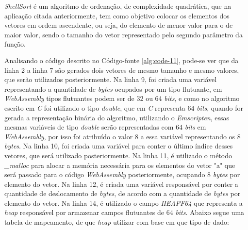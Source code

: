 \textit{ShellSort} é um algoritmo de ordenação, de complexidade quadrática, que na
aplicação citada anteriormente, tem como objetivo colocar os elementos dos vetores em
ordem ascendente, ou seja, do elemento de menor valor para o de maior valor, sendo o
tamanho do vetor representado pelo segundo parâmetro da função.

Analisando o código descrito no Código-fonte \ref{alg:code-11}, pode-se ver que da linha 2
a linha 7 são gerados dois vetores de mesmo tamanho e mesmo valores, que serão utilizados
posteriormente. Na linha 9, foi criada uma variável representando a quantidade de
\textit{bytes} ocupados por um tipo flutuante, em \textit{WebAssembly} tipos flutuantes
podem ser de 32 ou 64 \textit{bits}, e como no algoritmo escrito em \textit{C} foi
utilizado o tipo \textit{double}, que em \textit{C} representa 64 \textit{bits}, quando
for gerada a representação binária do algoritmo, utilizando o \textit{Emscripten}, essas
mesmas variáveis de tipo \textit{double} serão representadas com 64 \textit{bits} em
\textit{WebAssembly}, por isso foi atribuído o valor 8 a essa variável representando os 8
\textit{bytes}. Na linha 10, foi criada uma variável para conter o último índice desses
vetores, que será utilizado posteriormente. Na linha 11, é utilizado o método
\textit{\_malloc} para alocar a memória necessária para os elementos do vetor "a" que será
passado para o código \textit{WebAssembly} posteriormente, ocupando 8 \textit{bytes}
por elemento do vetor. Na linha 12, é criada uma variável responsável por conter a
quantidade de deslocamento de \textit{bytes}, de acordo com a quantidade de \textit{bytes}
por elemento do vetor. Na linha 14, é utilizado o campo \textit{HEAPF64} que representa a
\textit{heap} responsável por armazenar campos flutuantes de 64 \textit{bits}. Abaixo
segue uma tabela de mapeamento, de que \textit{heap} utilizar com base em que tipo de
dado:

\begin{table}[ht]
\end{table}

